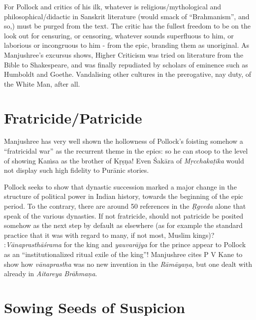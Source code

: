 For Pollock and critics of his ilk, whatever is religious/mythological and philosophical/didactic in Sanskrit literature (would smack of “Brahmanism”, and so,) must be purged from the text. The critic has the fullest freedom to be on the look out for censuring, or censoring, whatever sounds superfluous to him, or laborious or incongruous to him - from the epic, branding them as unoriginal. As Manjushree's excursus shows, Higher Criticism was tried on literature from the Bible to Shakespeare, and was finally repudiated by scholars of eminence such as Humboldt and Goethe. Vandalising other cultures in the prerogative, nay duty, of the White Man, after all.\\[-20pt]

\section*{Fratricide/Patricide}

Manjushree has very well shown the hollowness of Pollock's foisting somehow a “fratricidal war” as the recurrent theme in the epics: so he can stoop to the level of showing Kaṁsa as the brother of Kṛṣṇa! Even Śakāra of {\sl Mṛcchakaṭika} would not display such high fidelity to Purānic stories.

Pollock seeks to show that dynastic succession marked a major change in the structure of political power in Indian history, towards the beginning of the epic period. To the contrary, there are around 50 references in the {\sl Ṛgveda} alone that speak of the various dynasties. If not fratricide, should not patricide be posited somehow as the next step by default as elsewhere (as for example the standard practice that it was with regard to many, if not most, Muslim kings)? :{\sl Vānaprasthāśrama} for the king and {\sl yauvarājya} for the prince appear to Pollock as an “institutionalized ritual exile of the king”! Manjushree cites P V Kane to show how {\sl vānaprastha} was no new invention in the {\sl Rāmāyaṇa}, but one dealt with already in {\sl Aitareya Brāhmaṇa}.\\[-20pt]

\section*{Sowing Seeds of Suspicion}


